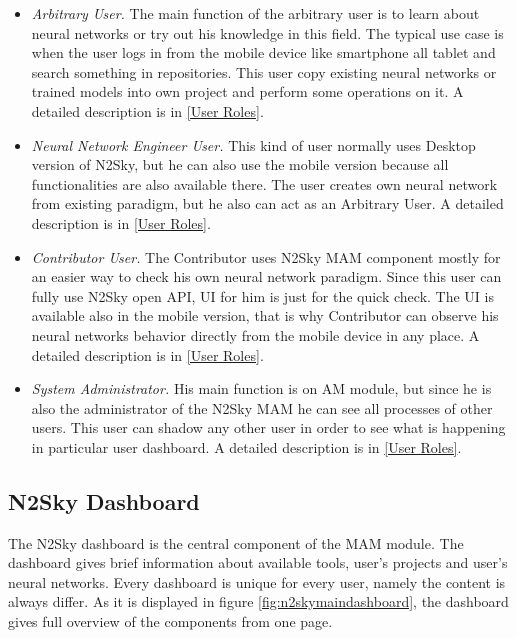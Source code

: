 \begin{itemize}
\item \emph{Arbitrary User.} The main function of the arbitrary user is to learn about neural networks or try out his knowledge in this field. The typical use case is when the user logs in from the mobile device like smartphone all tablet and search something in repositories. This user copy existing neural networks or trained models into own project and perform some operations on it.  A detailed description is in \autoref{User Roles}. 
\item \emph{Neural Network Engineer User.} This kind of user normally uses Desktop version of N2Sky, but he can also use the mobile version because all functionalities are also available there. The user creates own neural network from existing paradigm, but he also can act as an Arbitrary User.  A detailed description is in \autoref{User Roles}. 
\item \emph{Contributor User.} The Contributor uses N2Sky MAM component mostly for an easier way to check his own neural network paradigm. Since this user can fully use N2Sky open API, UI for him is just for the quick check. The UI is available also in the mobile version, that is why Contributor can observe his neural networks behavior directly from the mobile device in any place. A detailed description is in \autoref{User Roles}. 
\item \emph{System Administrator.} His main function is on AM module, but since he is also the administrator of the N2Sky MAM he can see all processes of other users. This user can shadow any other user in order to see what is happening in particular user dashboard.  A detailed description is in \autoref{User Roles}. 
\end{itemize}

\subsection{N2Sky Dashboard}\label{N2Sky Dashboard}
The N2Sky dashboard is the central component of the MAM module. The dashboard gives brief information about available tools, user's projects and user's neural networks. Every dashboard is unique for every user, namely the content is always differ. As it is displayed in figure \ref{fig:n2skymaindashboard}, the dashboard gives full overview of the components from one page.

